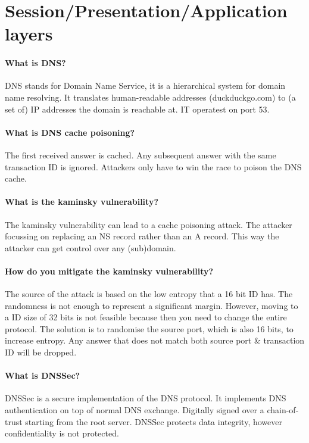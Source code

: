 \section{Session/Presentation/Application layers}
\paragraph{What is DNS?}
DNS stands for Domain Name Service, it is a hierarchical system for domain name resolving. It translates human-readable addresses (duckduckgo.com) to (a set of) IP addresses the domain is reachable at. IT operatest on port 53.

\paragraph{What is DNS cache poisoning?}
The first received answer is cached. Any subsequent answer with the same transaction ID is ignored. Attackers only have to win the race to poison the DNS cache.

\paragraph{What is the kaminsky vulnerability?}
The kaminsky vulnerability can lead to a cache poisoning attack. The attacker focussing on replacing an NS record rather than an A record. This way the attacker can get control over any (sub)domain.

\paragraph{How do you mitigate the kaminsky vulnerability?}
The source of the attack is based on the low entropy that a 16 bit ID has. The randomness is not enough to represent a significant margin. However, moving to a ID size of 32 bits is not feasible because then you need to change the entire protocol. The solution is to randomise the source port, which is also 16 bits, to increase entropy. Any answer that does not match both source port \& transaction ID will be dropped.

\paragraph{What is DNSSec?}
DNSSec is a secure implementation of the DNS protocol. It implements DNS authentication on top of normal DNS exchange. Digitally signed over a chain-of-trust starting from the root server. DNSSec protects data integrity, however confidentiality is not protected.

